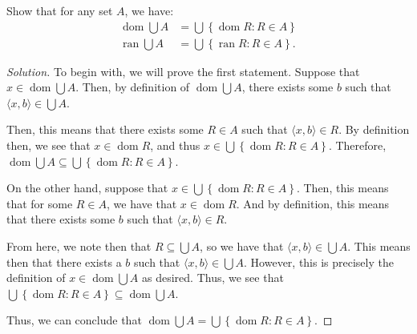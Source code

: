 \documentclass{article}
\newenvironment{solution}{\begin{proof}[Solution]}{\end{proof}}
\renewcommand\qedsymbol{$\blacksquare$}
\newenvironment{innerproof}{\renewcommand{\qedsymbol}{$\square$}\proof}{\endproof}
\DeclareMathOperator*{\dom}{\mathrm{dom}}
\DeclareMathOperator*{\ran}{\mathrm{ran}}
\newcommand{\pr}[1]{\left( {#1} \right)}
\newcommand{\brc}[1]{ \left\{  {#1} \right\}}
\newcommand{\ang}[1]{\langle {#1} \rangle}
\begin{document}
	\setcounter{subsection}{8}
	\begin{hw}
		Show that for any set $A$, we have:
		\begin{align*}
			\dom \bigcup A &= \bigcup \brc{\dom R : R \in A} \\
			\ran \bigcup A &= \bigcup \brc{\ran R : R \in A}.
		\end{align*}
	\end{hw}
	\begin{solution}
		To begin with, we will prove the first statement.
		\begin{innerproof}
			Suppose that $x \in \dom \bigcup A$. Then, by definition of $\dom \bigcup A$, there exists some $b$ such that $\ang{x,b} \in \bigcup A$.
			
			Then, this means that there exists some $R \in A$ such that $\ang{x,b} \in R$. By definition then, we see that $x \in \dom R$, and thus $x \in \bigcup \brc{\dom R : R \in A}$. Therefore, $\dom \bigcup A \subseteq \bigcup \brc{\dom R : R \in A}$.
			
			On the other hand, suppose that $x \in \bigcup \brc{\dom R : R \in A}$. Then, this means that for some $R \in A$, we have that $x \in \dom R$. And by definition, this means that there exists some $b$ such that $\ang{x,b} \in R$.
			
			From here, we note then that $R \subseteq \bigcup A$, so we have that $\ang{x,b} \in \bigcup A$. This means then that there exists a $b$ such that $\ang{x,b} \in \bigcup A$. However, this is precisely the definition of $x \in \dom \bigcup A$ as desired. Thus, we see that $\bigcup \brc{\dom R : R \in A} \subseteq \dom \bigcup A$.
			
			Thus, we can conclude that $\dom \bigcup A = \bigcup \brc{\dom R : R \in A}$.
			
			\begin{comment}
				We will proceed as follows:
				\begin{align*}
					x \in \dom \bigcup A &\iff x \in \brc{t : \exists b\pr{\ang{t,b} \in \bigcup A}} \\
					&\iff x \in \brc{t : \exists b\exists R\pr{\pr{\ang{t,b} \in R} \land \pr{R \in A}}} \\
					&\iff \exists R \pr{ \pr{x \in \dom R} \land \pr{R \in A}} \\
					&\iff x \in \bigcup \brc{\dom R : R \in A}.
				\end{align*}
			\end{comment}
		\end{innerproof}
		

\end{solution}
\end{document}
